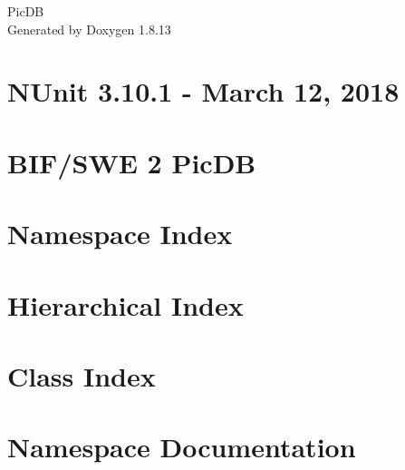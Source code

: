 \documentclass[twoside]{book}
\newcommand{\+}{\discretionary{\mbox{\scriptsize$\hookleftarrow$}}{}{}}
\newcommand{\clearemptydoublepage}{%
  \newpage{\pagestyle{empty}\cleardoublepage}%
}
\begin{document}
\hypersetup{pageanchor=false,
             bookmarksnumbered=true,
             pdfencoding=unicode
            }
\begin{titlepage}
\vspace*{7cm}
\begin{center}%
{\Large Pic\+DB }\\
\vspace*{1cm}
{\large Generated by Doxygen 1.8.13}\\
\end{center}
\end{titlepage}
\clearemptydoublepage
{}
\tableofcontents
\clearemptydoublepage
{}
\hypersetup{pageanchor=true}

\chapter{N\+Unit 3.10.1 -\/ March 12, 2018}
\label{md_packages_NUnit_83_810_81_CHANGES}

\chapter{B\+I\+F/\+S\+WE 2 Pic\+DB}
\label{md_README}

\chapter{Namespace Index}

\chapter{Hierarchical Index}

\chapter{Class Index}

\chapter{Namespace Documentation}






\end{document}
